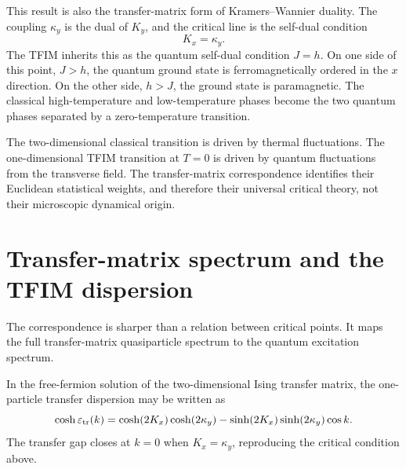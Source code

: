This result is also the transfer-matrix form of Kramers--Wannier duality.  The
coupling $\kappa_y$ is the dual of $K_y$, and the critical line is the self-dual
condition
\begin{equation}
\label{eq:ising-tfim-self-dual-condition}
    K_x=\kappa_y .
\end{equation}
The TFIM inherits this as the quantum self-dual condition $J=h$.  On one side of
this point, $J>h$, the quantum ground state is ferromagnetically ordered in the
$x$ direction.  On the other side, $h>J$, the ground state is paramagnetic.  The
classical high-temperature and low-temperature phases become the two quantum
phases separated by a zero-temperature transition.

\begin{remark}
The two-dimensional classical transition is driven by thermal fluctuations.  The
one-dimensional TFIM transition at $T=0$ is driven by quantum fluctuations from
the transverse field.  The transfer-matrix correspondence identifies their
Euclidean statistical weights, and therefore their universal critical theory, not
their microscopic dynamical origin.
\end{remark}

\section{Transfer-matrix spectrum and the TFIM dispersion}
\label{sec:ising-tfim-spectrum-dispersion}

The correspondence is sharper than a relation between critical points.  It maps
the full transfer-matrix quasiparticle spectrum to the quantum excitation
spectrum.

In the free-fermion solution of the two-dimensional Ising transfer matrix, the
one-particle transfer dispersion may be written as
\begin{equation}
\label{eq:ising-tfim-onsager-transfer-dispersion}
    \cosh\varepsilon_{\rm tr}(k)
    =
    \cosh(2K_x)\cosh(2\kappa_y)
    -
    \sinh(2K_x)\sinh(2\kappa_y)\cos k .
\end{equation}
The transfer gap closes at $k=0$ when $K_x=\kappa_y$, reproducing the critical
condition above.

